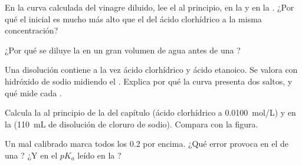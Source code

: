 \begin{exercise}[$\star\star$]\label{exo:g12:ph-conductivity-titrations:10}
En la curva calculada del vinagre diluido, lee el  al principio, en la
 y en la . ¿Por qué el  inicial es mucho
más alto que el del ácido clorhídrico a la misma concentración?
\end{exercise}

\begin{exercise}[$\star\star$]\label{exo:g12:ph-conductivity-titrations:11}
¿Por qué se diluye la  en un gran volumen de agua
antes de una ?
\end{exercise}

\begin{exercise}[$\star\star\star$]\label{exo:g12:ph-conductivity-titrations:12}
Una disolución contiene a la vez ácido clorhídrico y ácido etanoico. Se
valora con hidróxido de sodio midiendo el . Explica por qué la curva
presenta dos saltos, y qué mide cada .
\end{exercise}

\begin{exercise}[$\star\star\star$]\label{exo:g12:ph-conductivity-titrations:13}
Calcula la  al principio de la 
del capítulo (ácido clorhídrico a \qty{0.0100}{mol/L}) y en la
 (\qty{110}{mL} de disolución de cloruro de sodio). Compara
con la figura.
\end{exercise}

\begin{exercise}[$\star\star\star$]\label{exo:g12:ph-conductivity-titrations:14}
Un  mal calibrado marca todos los  0.2 por encima. ¿Qué error
provoca en el  de una ? ¿Y en
el $pK_a$ leído en la ?
\end{exercise}

